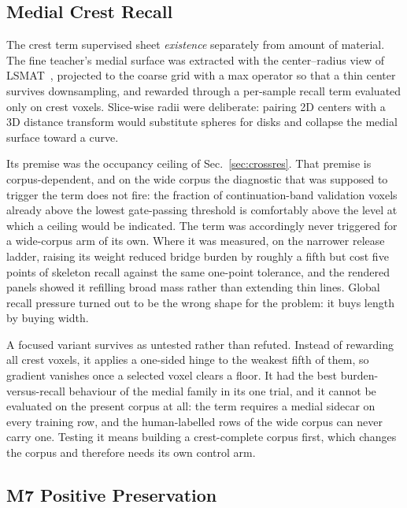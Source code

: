 \subsection{Medial Crest Recall}
\label{sec:also-crest}

The crest term supervised sheet \emph{existence} separately from amount of
material.
The fine teacher's medial surface was extracted with the center--radius view of
LSMAT~\cite{rebain2019lsmat}, projected to the coarse grid with a max operator
so that a thin center survives downsampling, and rewarded through a per-sample
recall term evaluated only on crest voxels.
Slice-wise radii were deliberate: pairing 2D centers with a 3D distance
transform would substitute spheres for disks and collapse the medial surface
toward a curve.

Its premise was the occupancy ceiling of Sec.~\ref{sec:crossres}.
That premise is corpus-dependent, and on the wide corpus the diagnostic that
was supposed to trigger the term does not fire: the fraction of
continuation-band validation voxels already above the lowest gate-passing
threshold is comfortably above the level at which a ceiling would be indicated.
The term was accordingly never triggered for a wide-corpus arm of its own.
Where it was measured, on the narrower release ladder, raising its weight
reduced bridge burden by roughly a fifth but cost five points of skeleton
recall against the same one-point tolerance, and the rendered panels showed it
refilling broad mass rather than extending thin lines.
Global recall pressure turned out to be the wrong shape for the problem: it
buys length by buying width.

A focused variant survives as untested rather than refuted.
Instead of rewarding all crest voxels, it applies a one-sided hinge to the
weakest fifth of them, so gradient vanishes once a selected voxel clears a floor.
It had the best burden-versus-recall behaviour of the medial family in its one
trial, and it cannot be evaluated on the present corpus at all: the term
requires a medial sidecar on every training row, and the human-labelled rows of
the wide corpus can never carry one.
Testing it means building a crest-complete corpus first, which changes the
corpus and therefore needs its own control arm.

\subsection{M7 Positive Preservation}
\label{sec:also-preservation}

